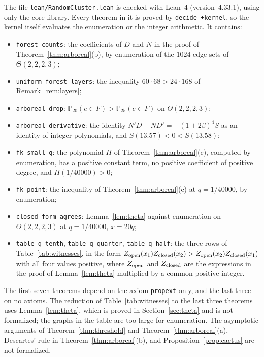 \documentclass[11pt]{amsart}
\theoremstyle{remark}
\numberwithin{equation}{section}
\newcommand{\Pp}{\mathbb P}
\begin{document}
The file \texttt{lean/RandomCluster.lean} is checked with Lean~4 \cite{Lean} (version~4.33.1), using only the core library. Every theorem in it is proved by \texttt{decide +kernel}, so the kernel itself evaluates the enumeration or the integer arithmetic. It contains:
\begin{itemize}[leftmargin=2em]\raggedright
\item \texttt{forest\_counts}: the coefficients of $D$ and $N$ in the proof of Theorem~\ref{thm:arboreal}(b), by enumeration of the $1024$ edge sets of $\Theta(2,2,2,3)$;
\item \texttt{uniform\_forest\_layers}: the inequality $60\cdot68>24\cdot168$ of Remark~\ref{rem:layers};
\item \texttt{arboreal\_drop}: $\Pp_{20}(e\in F)>\Pp_{25}(e\in F)$ on $\Theta(2,2,2,3)$;
\item \texttt{arboreal\_derivative}: the identity $N'D-ND'=-(1+2\beta)^4S$ as an identity of integer polynomials, and $S(13.57)<0<S(13.58)$;
\item \texttt{fk\_small\_q}: the polynomial $H$ of Theorem~\ref{thm:arboreal}(c), computed by enumeration, has a positive constant term, no positive coefficient of positive degree, and $H(1/40000)>0$;
\item \texttt{fk\_point}: the inequality of Theorem~\ref{thm:arboreal}(c) at $q=1/40000$, by enumeration;
\item \texttt{closed\_form\_agrees}: Lemma~\ref{lem:theta} against enumeration on $\Theta(2,2,2,3)$ at $q=1/40000$, $x=20q$;
\item \texttt{table\_q\_tenth}, \texttt{table\_q\_quarter}, \texttt{table\_q\_half}: the three rows of Table~\ref{tab:witnesses}, in the form $Z_{\rm open}(x_1)Z_{\rm closed}(x_2)>Z_{\rm open}(x_2)Z_{\rm closed}(x_1)$ with all four values positive, where $Z_{\rm open}$ and $Z_{\rm closed}$ are the expressions in the proof of Lemma~\ref{lem:theta} multiplied by a common positive integer.
\end{itemize}
The first seven theorems depend on the axiom \texttt{propext} only, and the last three on no axioms. The reduction of Table~\ref{tab:witnesses} to the last three theorems uses Lemma~\ref{lem:theta}, which is proved in Section~\ref{sec:theta} and is not formalized; the graphs in the table are too large for enumeration. The asymptotic arguments of Theorem~\ref{thm:threshold} and Theorem~\ref{thm:arboreal}(a), Descartes' rule in Theorem~\ref{thm:arboreal}(b), and Proposition~\ref{prop:cactus} are not formalized.
\end{document}
